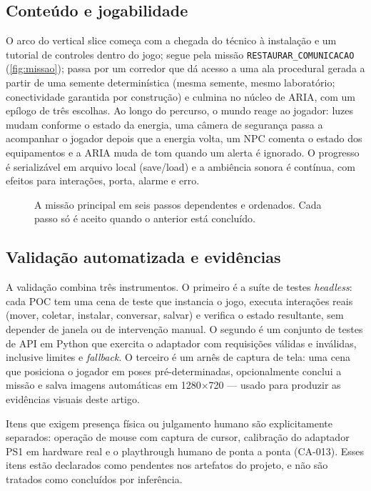 \subsection{Conteúdo e jogabilidade}

O arco do vertical slice começa com a chegada do técnico à instalação e um
tutorial de controles dentro do jogo; segue pela missão
\texttt{RESTAURAR\_COMUNICACAO} (\autoref{fig:missao}); passa por um corredor
que dá acesso a uma ala procedural gerada a partir de uma semente
determinística (mesma semente, mesmo laboratório; conectividade garantida por
construção) e culmina no núcleo de ARIA, com um epílogo de três escolhas. Ao
longo do percurso, o mundo reage ao jogador: luzes mudam conforme o estado da
energia, uma câmera de segurança passa a acompanhar o jogador depois que a
energia volta, um NPC comenta o estado dos equipamentos e a ARIA muda de tom
quando um alerta é ignorado. O progresso é serializável em arquivo local
(save/load) e a ambiência sonora é contínua, com efeitos para interações,
porta, alarme e erro.

\begin{figure}[H]
\centering
{}
\caption{A missão principal em seis passos dependentes e ordenados. Cada passo só é aceito quando o anterior está concluído.}
\label{fig:missao}
\end{figure}

\subsection{Validação automatizada e evidências}

A validação combina três instrumentos. O primeiro é a suíte de testes
\emph{headless}: cada POC tem uma cena de teste que instancia o jogo, executa
interações reais (mover, coletar, instalar, conversar, salvar) e verifica o
estado resultante, sem depender de janela ou de intervenção manual. O segundo
é um conjunto de testes de API em Python que exercita o adaptador com
requisições válidas e inválidas, inclusive limites e \emph{fallback}. O
terceiro é um arnês de captura de tela: uma cena que posiciona o jogador em
poses pré-determinadas, opcionalmente conclui a missão e salva imagens
automáticas em 1280$\times$720 --- usado para produzir as evidências visuais
deste artigo.

Itens que exigem presença física ou julgamento humano são explicitamente
separados: operação de mouse com captura de cursor, calibração do adaptador
PS1 em hardware real e o playthrough humano de ponta a ponta (CA-013). Esses
itens estão declarados como pendentes nos artefatos do projeto, e não são
tratados como concluídos por inferência.

